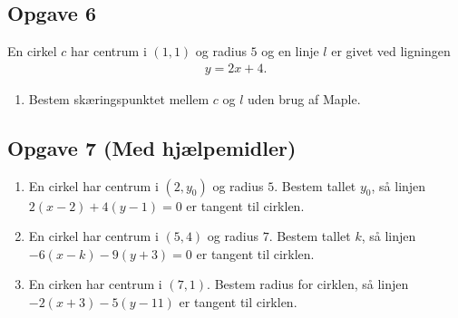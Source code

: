 \subsection*{Opgave 6}
En cirkel $c$ har centrum i $(1,1)$ og radius $5$ og en linje $l$ er givet ved ligningen
\begin{align*}
	y = 2x + 4.
\end{align*}
\begin{enumerate}[label=\roman*)]
	\item Bestem skæringspunktet mellem $c$ og $l$ uden brug af Maple. 
\end{enumerate}

\subsection*{Opgave 7 (Med hjælpemidler)}
\begin{enumerate}[label=\roman*)]
	\item En cirkel har centrum i $(2,y_0)$ og radius $5$. Bestem tallet $y_0$, så linjen $2(x-2) + 4(y-1) = 0$ 
	er tangent til cirklen.
	\item En cirkel har centrum i $(5,4)$ og radius $7$. Bestem tallet $k$, så linjen $-6(x-k)-9(y+3) = 0$ er 
	tangent til cirklen.
	\item En cirken har centrum i $(7,1)$. Bestem radius for cirklen, så linjen $-2(x+3)-5(y-11)$ er tangent
	til cirklen. 
\end{enumerate}
